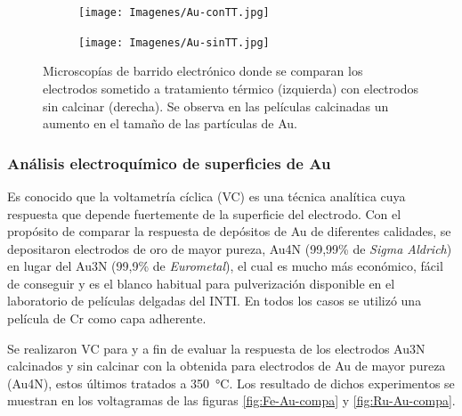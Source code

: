 {			 		\begin{figure}[th]
		 	   	    \begin{subfigure}[t]{0.49\textwidth}
			       	\texttt{[image: Imagenes/Au-conTT.jpg]}
			   		\end{subfigure}
			   		\begin{subfigure}[t]{0.49\textwidth}
			   	    \texttt{[image: Imagenes/Au-sinTT.jpg]}
			   		\end{subfigure}
					 \caption[Microscopía comparativa electrodos Au]{Microscopías de barrido electrónico donde se comparan los electrodos sometido a tratamiento térmico (izquierda) con electrodos sin calcinar (derecha). Se observa en las películas calcinadas un aumento en el tamaño de las partículas de Au.}
					 \label{fig:Au_compTT}	
				     \end{figure}
	
		\subsubsection{Análisis electroquímico de superficies de Au}

			Es conocido que la voltametría cíclica (VC) es una técnica analítica cuya respuesta que depende fuertemente de la superficie del electrodo.\cite{Wi2000,Pumera2007,Gewirth2004,Villullas2000} Con el propósito de comparar la respuesta de depósitos de Au de diferentes calidades, se depositaron electrodos de oro de mayor pureza, Au4N (99,99\% de \textit{Sigma Aldrich}) en lugar del Au3N (99,9\% de \textit{Eurometal}), el cual es mucho más económico, fácil de conseguir y es el blanco habitual para pulverización disponible en el laboratorio de películas delgadas del INTI. En todos los casos se utilizó una película de Cr como capa adherente.

			Se realizaron VC para \ru\space y \fe\space a fin de evaluar la respuesta de los electrodos Au3N calcinados y sin calcinar con la obtenida para electrodos de Au de mayor pureza (Au4N), estos últimos tratados a \SI{350}{\celsius}. Los resultado de dichos experimentos se muestran en los voltagramas de las figuras \ref{fig:Fe-Au-compa} y \ref{fig:Ru-Au-compa}.

}
